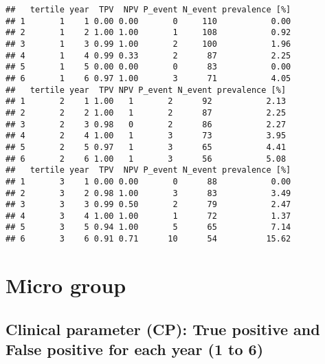 \documentclass[
]{article}
\begin{document}
\begin{verbatim}
##   tertile year  TPV  NPV P_event N_event prevalence [%]
## 1       1    1 0.00 0.00       0     110           0.00
## 2       1    2 1.00 1.00       1     108           0.92
## 3       1    3 0.99 1.00       2     100           1.96
## 4       1    4 0.99 0.33       2      87           2.25
## 5       1    5 0.00 0.00       0      83           0.00
## 6       1    6 0.97 1.00       3      71           4.05
##   tertile year  TPV NPV P_event N_event prevalence [%]
## 1       2    1 1.00   1       2      92           2.13
## 2       2    2 1.00   1       2      87           2.25
## 3       2    3 0.98   0       2      86           2.27
## 4       2    4 1.00   1       3      73           3.95
## 5       2    5 0.97   1       3      65           4.41
## 6       2    6 1.00   1       3      56           5.08
##   tertile year  TPV  NPV P_event N_event prevalence [%]
## 1       3    1 0.00 0.00       0      88           0.00
## 2       3    2 0.98 1.00       3      83           3.49
## 3       3    3 0.99 0.50       2      79           2.47
## 4       3    4 1.00 1.00       1      72           1.37
## 5       3    5 0.94 1.00       5      65           7.14
## 6       3    6 0.91 0.71      10      54          15.62
\end{verbatim}

\hypertarget{micro-group}{%
\section{Micro group}\label{micro-group}}

\hypertarget{clinical-parameter-cp-true-positive-and-false-positive-for-each-year-1-to-6-1}{%
\subsection{Clinical parameter (CP): True positive and False positive
for each year (1 to
6)}\label{clinical-parameter-cp-true-positive-and-false-positive-for-each-year-1-to-6-1}}
\end{document}

